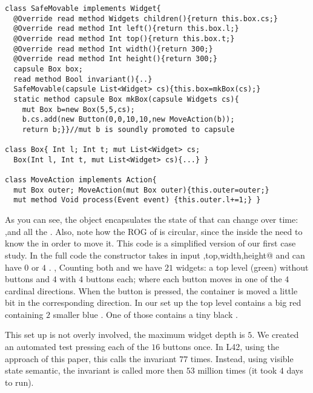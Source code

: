 \begin{lstlisting}
class SafeMovable implements Widget{
  @Override read method Widgets children(){return this.box.cs;}
  @Override read method Int left(){return this.box.l;}
  @Override read method Int top(){return this.box.t;}
  @Override read method Int width(){return 300;}
  @Override read method Int height(){return 300;}
  capsule Box box;
  read method Bool invariant(){..}
  SafeMovable(capsule List<Widget> cs){this.box=mkBox(cs);}
  static method capsule Box mkBox(capsule Widgets cs){
    mut Box b=new Box(5,5,cs);
    b.cs.add(new Button(0,0,10,10,new MoveAction(b));
    return b;}}//mut b is soundly promoted to capsule

class Box{ Int l; Int t; mut List<Widget> cs;
  Box(Int l, Int t, mut List<Widget> cs){...} }

class MoveAction implements Action{
  mut Box outer; MoveAction(mut Box outer){this.outer=outer;}
  mut method Void process(Event event) {this.outer.l+=1;} }
\end{lstlisting}

As you can see, the \Q@Box@ object encapsulates the state of \Q@SafeMovable@ that can change over time:
\Q@left@,\Q@top@ and all the \Q@children@.
Also, note how the ROG of \Q@Box@ is circular, since
the \Q@MoveAction@ inside the \Q@Button@ need to know the \Q@Box@ in order to move it.
This code is a simplified version of our first case study. In the full code
the \Q@SafeMovable@ constructor takes in input
\Q@left,top,width,height@ and can have $0$ or $4$ \Q@Button@s.
,%
Counting both \Q@SafeMovable@s and \Q@Button@s we have $21$ widgets:
 a top level \Q@SafeMovable@ (green) without buttons and $4$ \Q@SafeMovable@ with
$4$ buttons each; where each button moves in one of the $4$ cardinal directions.
When the button is pressed, the container is moved 
a little bit in the corresponding direction. 
In our set up
the top level \Q@SafeMovable@
contains a big red \Q@SafeMovable@
 containing $2$ smaller blue \Q@SafeMovable@. One of those contains a tiny black \Q@SafeMovable@.

This set up is not overly involved, the maximum widget depth is $5$.
We created an automated test pressing each of the $16$ buttons once.
In L42, using the approach of this paper, this calls the invariant $77$ times.
Instead, using visible state semantic, 
the invariant is called more then $53$ million times
(it took $4$ days to run).

